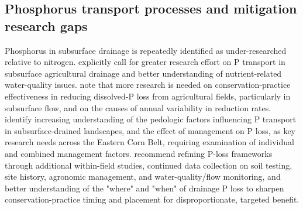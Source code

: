 \subsection{Phosphorus transport processes and mitigation research gaps}

Phosphorus in subsurface drainage is repeatedly identified as under-researched relative to nitrogen. \textcite{Hertzberger2019} explicitly call for greater research effort on P transport in subsurface agricultural drainage and better understanding of nutrient-related water-quality issues. \textcite{Yuan2022} note that more research is needed on conservation-practice effectiveness in reducing dissolved-P loss from agricultural fields, particularly in subsurface flow, and on the causes of annual variability in reduction rates. \textcite{Pease2018} identify increasing understanding of the pedologic factors influencing P transport in subsurface-drained landscapes, and the effect of management on P loss, as key research needs across the Eastern Corn Belt, requiring examination of individual and combined management factors. \textcite{deOliveira2022} recommend refining P-loss frameworks through additional within-field studies, continued data collection on soil testing, site history, agronomic management, and water-quality/flow monitoring, and better understanding of the "where" and "when" of drainage P loss to sharpen conservation-practice timing and placement for disproportionate, targeted benefit.

